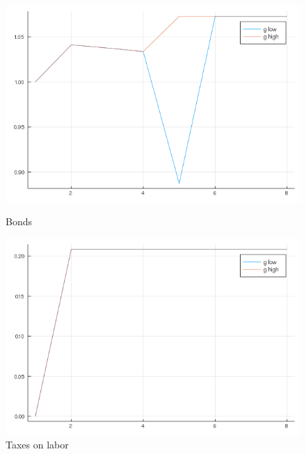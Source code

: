\documentclass[12pt]{article}
\begin{document}
\begin{figure}[h]
    \centering
    \begin{minipage}{0.45\textwidth}
        \centering
        \includegraphics[width=1\textwidth]{QE_B.png} %
        \caption{Bonds}
    \end{minipage}\hfill
    \begin{minipage}{0.45\textwidth}
        \centering
        \includegraphics[width=1\textwidth]{QE_tau.png} %
        \caption{Taxes on labor}
    \end{minipage}
\end{figure}





\newpage

\end{document}
